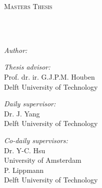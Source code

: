 \documentclass[
11pt, %
english, %
singlespacing, %
headsepline, %
]{MastersDoctoralThesis} %
\author{Philippe Lammerts} %
\begin{document}
\frontmatter %

\pagestyle{plain} %


\begin{titlepage}
	\begin{center}

		\vspace*{.06\textheight}
		{\scshape\LARGE \univname\par}\vspace{1.5cm} %
		\textsc{\Large Masters Thesis}\\[0.5cm] %

		\HRule \\[0.4cm] %
		{\huge \bfseries \ttitle\par}\vspace{0.4cm} %
		\HRule \\[1.5cm] %

		\begin{minipage}[t]{0.4\textwidth}
			\begin{flushleft} \large
				\emph{Author:}\\
				\authorname %
			\end{flushleft}
		\end{minipage}
		\begin{minipage}[t]{0.5\textwidth}
			\begin{flushright} \large
				\emph{Thesis advisor:}\\
				Prof. dr. ir. G.J.P.M. Houben\\
				Delft University of Technology
			\end{flushright}

			\begin{flushright} \large
				\emph{Daily supervisor:} \\
				Dr. J. Yang\\
				Delft University of Technology
			\end{flushright}

			\begin{flushright} \large
				\emph{Co-daily supervisors:} \\
				Dr. Y-C. Hsu\\
				University of Amsterdam\\
				\vspace{5mm}
				P. Lippmann\\
				Delft University of Technology\\
			\end{flushright}



\end{minipage}
\end{center}
\end{titlepage}
\end{document}
